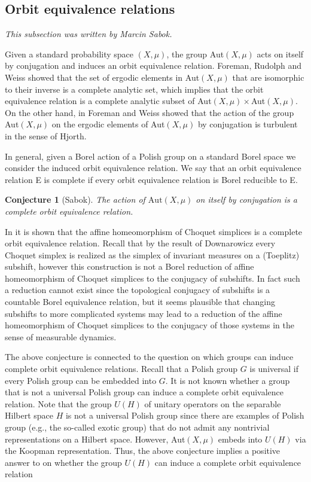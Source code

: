 \documentclass{article}
\newtheorem{conjecture}[theorem]{Conjecture}
\theoremstyle{definition}
\begin{document}
\subsection{Orbit equivalence relations}
\textit{This subsection was written by Marcin Sabok.}

Given a  standard probability space $(X,\mu)$, the group Aut$(X,\mu)$ acts on itself by conjugation and induces an orbit equivalence relation. Foreman, Rudolph and Weiss \cite{foremanconjugacyproblemergodic2011} showed that  the set of ergodic elements in Aut$(X,\mu)$ that are isomorphic to their inverse is a complete analytic set, which implies that the orbit equivalence relation is a complete analytic subset of Aut$(X,\mu)\times$Aut$(X,\mu)$. On the other hand, in \cite{FW} Foreman and Weiss showed that the action of the group Aut$(X,\mu)$ on the ergodic elements of Aut$(X,\mu)$ by conjugation is turbulent in the sense of Hjorth.


In general, given a Borel action of a Polish group on a standard Borel space we consider the induced orbit equivalence relation. We say that an orbit equivalence relation E is complete if every orbit equivalence relation is Borel reducible to E.

\begin{conjecture} [Sabok] The action of $\mathrm{Aut}(X,\mu)$ on itself by conjugation is a complete orbit equivalence relation.
\end{conjecture}


In \cite{Sab} it is shown that the affine homeomorphism of Choquet simplices is a complete orbit equivalence relation. Recall that by the result of Downarowicz \cite{Dow} every Choquet simplex is realized as the simplex of invariant measures on a (Toeplitz) subshift, however this construction is not a Borel reduction of affine homeomorphism of Choquet simplices to the conjugacy of subshifts. In fact such a reduction cannot exist since the topological conjugacy of subshifts is a countable Borel equivalence relation, but it seems plausible that changing subshifts to more complicated systems may lead to a reduction of the affine homeomorphism of Choquet simplices to the conjugacy of those systems in the sense of measurable dynamics.

The above conjecture is connected to the question on which groups can induce complete orbit equivalence relations. Recall that a Polish group $G$ is universal if every Polish group can be embedded into $G$. It is not known whether a group that is not a universal Polish group can induce a complete orbit equivalence relation. Note that the group $U(H)$ of unitary operators on the separable Hilbert space $H$ is not a universal Polish group since there are examples of Polish group (e.g., the so-called exotic group) that do not admit any nontrivial representations on a Hilbert space. However, Aut$(X,\mu)$ embeds into $U(H)$ via the Koopman representation. Thus, the above conjecture implies a positive answer to \cite[Question 9.3]{Sab} on whether the group $U(H)$ can induce a complete orbit equivalence relation
\end{document}
